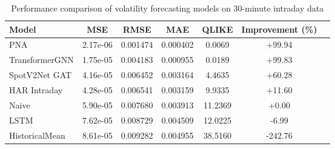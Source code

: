 \documentclass[journal]{IEEEtran}
\begin{document}
\begin{table}[!t]
\centering
\caption{Performance comparison of volatility forecasting models on 30-minute intraday data}
\label{tab:main_results}
\begin{tabular}{@{}lcccccc@{}}
\toprule
Model & MSE & RMSE & MAE & QLIKE & Improvement (\%) \\
\midrule
PNA & 2.17e-06 & 0.001474 & 0.000402 & 0.0069 & +99.94 \\
TransformerGNN & 1.75e-05 & 0.004183 & 0.000955 & 0.0189 & +99.83 \\
SpotV2Net GAT & 4.16e-05 & 0.006452 & 0.003164 & 4.4635 & +60.28 \\
HAR Intraday & 4.28e-05 & 0.006541 & 0.003159 & 9.9335 & +11.60 \\
\rowcolor{bestcolor}Naive & 5.90e-05 & 0.007680 & 0.003913 & 11.2369 & +0.00 \\
LSTM & 7.62e-05 & 0.008729 & 0.004509 & 12.0225 & -6.99 \\
HistoricalMean & 8.61e-05 & 0.009282 & 0.004955 & 38.5160 & -242.76 \\
\bottomrule
\end{tabular}
\end{table}
\end{document}
